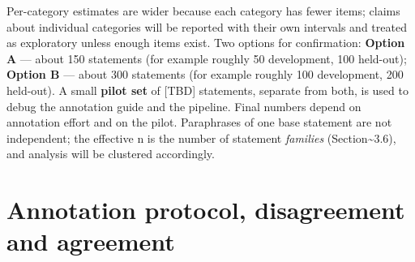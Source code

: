 \documentclass[
  11pt,a4paper,oneside]{report}
\begin{document}
Per-category estimates are wider because each category has fewer items;
claims about individual categories will be reported with their own
intervals and treated as exploratory unless enough items exist. Two
options for confirmation: \textbf{Option A} --- about 150 statements
(for example roughly 50 development, 100 held-out); \textbf{Option B}
--- about 300 statements (for example roughly 100 development, 200
held-out). A small \textbf{pilot set} of {[}TBD{]} statements, separate
from both, is used to debug the annotation guide and the pipeline. Final
numbers depend on annotation effort and on the pilot. Paraphrases of one
base statement are not independent; the effective n is the number of
statement \emph{families} (Section\textasciitilde3.6), and analysis will
be clustered accordingly.

\hypertarget{annotation-protocol-disagreement-and-agreement}{%
\section{Annotation protocol, disagreement and
agreement}\label{annotation-protocol-disagreement-and-agreement}}
\end{document}
